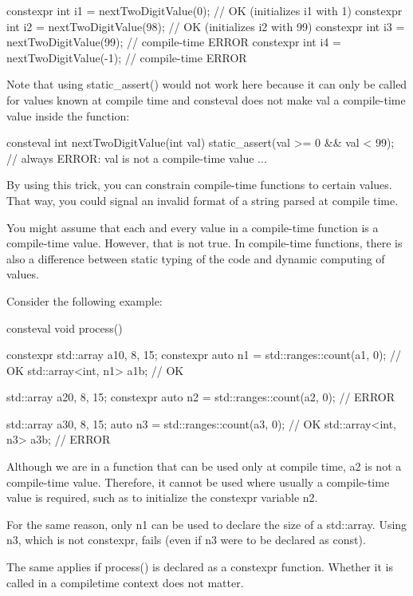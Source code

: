 \begin{cpp}
constexpr int i1 = nextTwoDigitValue(0); // OK (initializes i1 with 1)
constexpr int i2 = nextTwoDigitValue(98); // OK (initializes i2 with 99)
constexpr int i3 = nextTwoDigitValue(99); // compile-time ERROR
constexpr int i4 = nextTwoDigitValue(-1); // compile-time ERROR
\end{cpp}

Note that using static\_assert() would not work here because it can only be called for values known at compile time and consteval does not make val a compile-time value inside the function:

\begin{cpp}
consteval int nextTwoDigitValue(int val)
{
	static_assert(val >= 0 && val < 99); // always ERROR: val is not a compile-time value
	...
}
\end{cpp}

By using this trick, you can constrain compile-time functions to certain values. That way, you could signal an invalid format of a string parsed at compile time.


You might assume that each and every value in a compile-time function is a compile-time value. However, that is not true. In compile-time functions, there is also a difference between static typing of the code and dynamic computing of values.

Consider the following example:

\begin{cpp}
consteval void process()
{
	constexpr std::array a1{0, 8, 15};
	constexpr auto n1 = std::ranges::count(a1, 0); // OK
	std::array<int, n1> a1b; // OK
	
	std::array a2{0, 8, 15};
	constexpr auto n2 = std::ranges::count(a2, 0); // ERROR
	
	std::array a3{0, 8, 15};
	auto n3 = std::ranges::count(a3, 0); // OK
	std::array<int, n3> a3b; // ERROR
}
\end{cpp}

Although we are in a function that can be used only at compile time, a2 is not a compile-time value. Therefore, it cannot be used where usually a compile-time value is required, such as to initialize the constexpr variable n2.

For the same reason, only n1 can be used to declare the size of a std::array. Using n3, which is not constexpr, fails (even if n3 were to be declared as const).

The same applies if process() is declared as a constexpr function. Whether it is called in a compiletime context does not matter.





